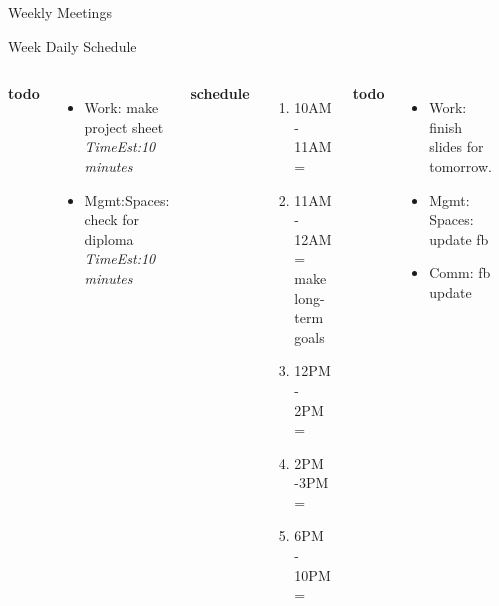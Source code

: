 \documentclass[serif, mathserif, final]{beamer}
\newcommand{\te}[1]{\textit{TimeEst:}\textit{#1}}
\begin{document}
\begin{frame}
\begin{columns}
\begin{column}{0.5\linewidth}
\begin{block}{Weekly Meetings}
{\begin{block}{Week Daily Schedule}
\begin{columns}
          \textbf{\small todo} \\
          \begin{itemize}
            \tiny \item \tiny Work: make project sheet \te{10 minutes} 
          \item \tiny Mgmt:Spaces: check for diploma \te{10 minutes} 
          \end{itemize}  
          \textbf{\small schedule} 
          \begin{enumerate}
            \tiny \item \tiny 10AM - 11AM = 
          \item \tiny 11AM - 12AM = make long-term goals 
          \item \tiny 12PM - 2PM = 
            \tiny \item \tiny 2PM -3PM = 
          \item \tiny 6PM - 10PM = 
          \end{enumerate} 
          
          \textbf{\small todo} \\
          \begin{itemize}
           \tiny \item \tiny Work: finish slides for tomorrow. 
           \item \tiny Mgmt: Spaces: update fb 
         \item \tiny Comm: fb update 
          \end{itemize}
          \textbf{\small schedule} \\
          \begin{enumerate}
            \tiny \item \tiny 8-9AM: Regular Routines 
          \item \tiny 9AM - 10AM: Send message 
            \item \tiny 6:30PM - 7:30PM = 
          \end{enumerate} 
          \textbf{\small todo}\\
          \begin{itemize}  
            \tiny \item \tiny 
          \item \tiny 
          \end{itemize} 


\end{columns}
\end{block}}
\end{block}
\end{column}
\end{columns}
\end{frame}
\end{document}
